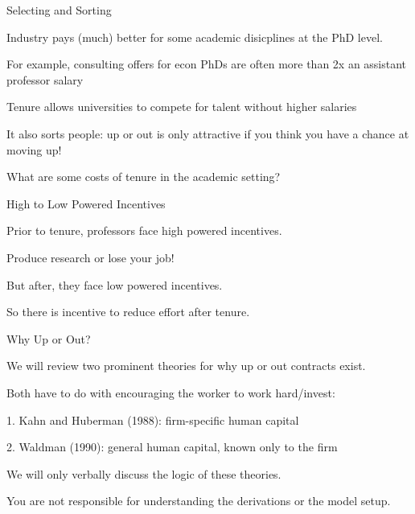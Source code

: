 \documentclass[aspectratio=169,usenames,dvipsnames]{beamer}
\newenvironment{wideitemize}{\itemize\addtolength{\itemsep}{10pt}}{\enditemize}
\begin{document}
\begin{frame}{Selecting and Sorting}

\begin{wideitemize}
    \item Industry pays (much) better for some academic disicplines at the PhD level.
    \item For example, consulting offers for econ PhDs are often more than 2x an assistant professor salary
    \item Tenure allows universities to compete for talent without higher salaries
    \item It also sorts people: up or out is only attractive if you think you have a chance at moving up!
\end{wideitemize}
    
\end{frame}


\begin{frame}
\centering
    \huge What are some costs of tenure in the academic setting?
\end{frame}

\begin{frame}{High to Low Powered Incentives}

\begin{wideitemize}
    \item Prior to tenure, professors face high powered incentives.
    \item Produce research or lose your job!
    \item But after, they face low powered incentives.
    \item So there is incentive to reduce effort after tenure.
\end{wideitemize}
    
\end{frame}


\begin{frame}{Why Up or Out?}

    \begin{wideitemize}
        \item We will review two prominent theories for why up or out contracts exist.
        \item Both have to do with encouraging the worker to work hard/invest:
        \begin{wideitemize}
            \item[1.] Kahn and Huberman (1988): firm-specific human capital
            \item[2.] Waldman (1990): general human capital, known only to the firm
        \end{wideitemize}
        \item We will only verbally discuss the logic of these theories.
        \item You are not responsible for understanding the derivations or the model setup.
    \end{wideitemize}
\end{frame}
\end{document}
